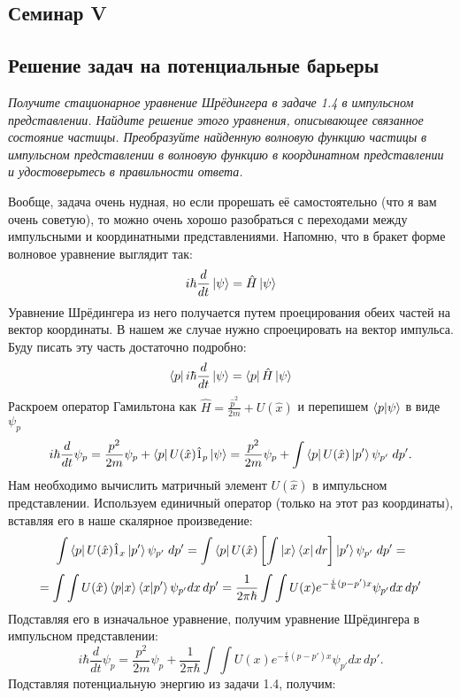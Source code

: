 \begin{center}
    \section{Семинар V}
\end{center}
\subsection{Решение задач на потенциальные барьеры}
\begin{center}
    \textit{Получите стационарное уравнение Шрёдингера в задаче 1.4 в импульсном представлении. Найдите решение этого уравнения, описывающее связанное состояние частицы. Преобразуйте найденную волновую функцию частицы в импульсном представлении в волновую функцию в координатном представлении и удостоверьтесь в правильности ответа.}
\end{center}
Вообще, задача очень нудная, но если прорешать её самостоятельно (что я вам очень советую), то можно очень хорошо разобраться с переходами между импульсными и координатными представлениями. Напомню, что в бракет форме волновое уравнение выглядит так:
\[
i\hbar \frac{d}{dt} \ket{\psi} = \hat H \ket{\psi}
\]
Уравнение Шрёдингера из него получается путем проецирования обеих частей на вектор координаты. В нашем же случае нужно спроецировать на вектор импульса. Буду писать эту часть достаточно подробно:
\[
\bra{p} i\hbar \frac{d}{dt} \ket{\psi} = \bra{p} \hat H \ket{\psi}
\]
Раскроем оператор Гамильтона как $\hat H = \frac{\hat p^2}{2m} + U(\hat x)$ и перепишем $\bra{p}\ket{\psi}$ в виде $\psi_p$
\[
i\hbar \frac{d}{dt} \psi_p = \frac{p^2}{2m}\psi_p + \bra{p}U(\hat{x})\hat{1}_p\ket{\psi} = \frac{p^2}{2m}\psi_p + \int\bra{p}U(\hat x)\ket{p'}\psi_{p'}\;dp'.
\]
Нам необходимо вычислить матричный элемент $U(\hat{x})$ в импульсном представлении. Используем единичный оператор (только на этот раз координаты), вставляя его в наше скалярное произведение:
\[
\int\bra{p}U(\hat x)\hat{1}_x\ket{p'}\psi_{p'}\;dp' = \int \bra{p}U(\hat x)\left[\int\ket{x}\bra{x}dr\right]\ket{p'} \psi_{p'}\;dp'=
\]
\[
= \int\int U(\hat x)\bra{p}\ket{x}\bra{x}\ket{p'} \psi_{p'} dx\,dp' = \frac{1}{2\pi\hbar}\int\int U(x) e^{-\frac{i}{h}(p-p')x}\psi_{p'} dx\,dp'
\]
Подставляя его в изначальное уравнение, получим уравнение Шрёдингера в импульсном представлении:
\[
i\hbar \frac{d}{dt} \psi_p =\frac{p^2}{2m}\psi_p + \frac{1}{2\pi\hbar}\int\int U(x) e^{-\frac{i}{h}(p-p')x}\psi_{p'} dx\,dp'.
\]
Подставляя потенциальную энергию из задачи 1.4, получим:
